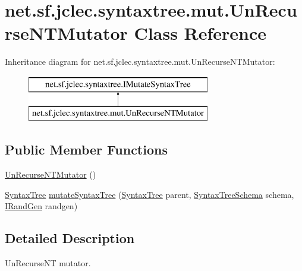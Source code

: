 \hypertarget{classnet_1_1sf_1_1jclec_1_1syntaxtree_1_1mut_1_1_un_recurse_n_t_mutator}{\section{net.\-sf.\-jclec.\-syntaxtree.\-mut.\-Un\-Recurse\-N\-T\-Mutator Class Reference}
\label{classnet_1_1sf_1_1jclec_1_1syntaxtree_1_1mut_1_1_un_recurse_n_t_mutator}
}
Inheritance diagram for net.\-sf.\-jclec.\-syntaxtree.\-mut.\-Un\-Recurse\-N\-T\-Mutator\-:\begin{figure}[H]
\begin{center}
\leavevmode
\includegraphics[height=2.000000cm]{classnet_1_1sf_1_1jclec_1_1syntaxtree_1_1mut_1_1_un_recurse_n_t_mutator}
\end{center}
\end{figure}
\subsection*{Public Member Functions}
\begin{DoxyCompactItemize}
\item 
\hyperlink{classnet_1_1sf_1_1jclec_1_1syntaxtree_1_1mut_1_1_un_recurse_n_t_mutator_a73d7063bab806562ee3c8b175d8a799a}{Un\-Recurse\-N\-T\-Mutator} ()
\item 
\hyperlink{classnet_1_1sf_1_1jclec_1_1syntaxtree_1_1_syntax_tree}{Syntax\-Tree} \hyperlink{classnet_1_1sf_1_1jclec_1_1syntaxtree_1_1mut_1_1_un_recurse_n_t_mutator_a982ec1bf7c47681a9187bd4476c8d9f6}{mutate\-Syntax\-Tree} (\hyperlink{classnet_1_1sf_1_1jclec_1_1syntaxtree_1_1_syntax_tree}{Syntax\-Tree} parent, \hyperlink{classnet_1_1sf_1_1jclec_1_1syntaxtree_1_1_syntax_tree_schema}{Syntax\-Tree\-Schema} schema, \hyperlink{interfacenet_1_1sf_1_1jclec_1_1util_1_1random_1_1_i_rand_gen}{I\-Rand\-Gen} randgen)
\end{DoxyCompactItemize}


\subsection{Detailed Description}
Un\-Recurse\-N\-T mutator.

